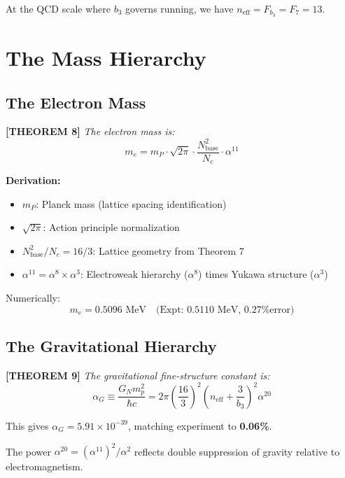 \documentclass[aps,prd,twocolumn,10pt,groupedaddress,superscriptaddress]{revtex4-2}
\begin{document}
At the QCD scale where $b_3$ governs running, we have $n_{\text{eff}} = F_{b_3} = F_7 = 13$.

\section{The Mass Hierarchy}

\subsection{The Electron Mass}

\textbf{[THEOREM 8]} \textit{The electron mass is:}
\begin{equation}
m_e = m_P \cdot \sqrt{2\pi} \cdot \frac{N_{\text{base}}^2}{N_c} \cdot \alpha^{11}
\end{equation}

\textbf{Derivation:}
\begin{itemize}
\item $m_P$: Planck mass (lattice spacing identification)
\item $\sqrt{2\pi}$: Action principle normalization
\item $N_{\text{base}}^2/N_c = 16/3$: Lattice geometry from Theorem 7
\item $\alpha^{11} = \alpha^8 \times \alpha^3$: Electroweak hierarchy ($\alpha^8$) times Yukawa structure ($\alpha^3$)
\end{itemize}

Numerically:
\begin{equation}
m_e = 0.5096 \text{ MeV} \quad \text{(Expt: 0.5110 MeV, 0.27\% error)}
\end{equation}

\subsection{The Gravitational Hierarchy}

\textbf{[THEOREM 9]} \textit{The gravitational fine-structure constant is:}
\begin{equation}
\alpha_G \equiv \frac{G_N m_p^2}{\hbar c} = 2\pi \left(\frac{16}{3}\right)^2 \left(n_{\text{eff}} + \frac{3}{b_3}\right)^2 \alpha^{20}
\end{equation}

This gives $\alpha_G = 5.91 \times 10^{-39}$, matching experiment to \textbf{0.06\%}.

The power $\alpha^{20} = (\alpha^{11})^2/\alpha^2$ reflects double suppression of gravity relative to electromagnetism.
\end{document}
